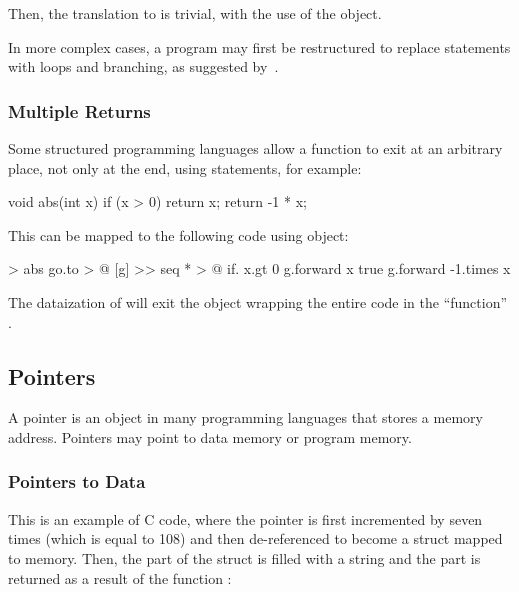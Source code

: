 \documentclass[sigplan,nonacm]{acmart}
\begin{document}
Then, the translation to \eolang{} is trivial, with the use of the  object.

In more complex cases, a program may first be restructured to replace  statements with loops and branching, as suggested by~\citet{williams1985restructuring,pan1996formal,erosa1994taming,ceccato2008goto}.

\subsubsection{Multiple Returns}

Some structured programming languages allow a function to exit at an arbitrary place, not only at the end, using  statements, for example:

\begin{ffcode}
void abs(int x) {
  if (x > 0) {
    return x;
  }
  return -1 * x;
}
\end{ffcode}

This can be mapped to the following \eolang{} code using  object:

\begin{ffcode}
[x] > abs
  go.to > @
    [g] >>
      seq * > @
        if.
          x.gt 0
          g.forward x
          true
        g.forward
          -1.times x
\end{ffcode}

The dataization of  will exit the  object wrapping the entire code in the ``function'' .

\subsection{Pointers}
\label{sec:pointers}

A pointer is an object in many programming languages that stores a memory address.
Pointers may point to data memory or program memory.

\subsubsection{Pointers to Data}

This is an example of C code, where the pointer  is first incremented by seven times  (which is equal to 108) and then de-referenced to become a struct  mapped to memory.
Then, the  part of the struct is filled with a string and the  part is returned as a result of the function :
\end{document}
